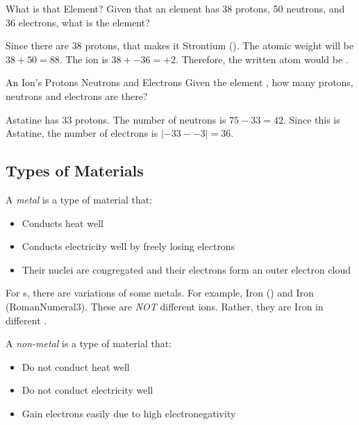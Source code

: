 \begin{example}[]{What is that Element?}
  Given that an element has 38 protons, 50 neutrons, and 36 electrons, what is the element?
  
  \tcblower
  
  Since there are 38 protons, that makes it Strontium ().
  The atomic weight will be $38 + 50 = 88$.
  The ion is $38 + -36 = +2$.
  Therefore, the written atom would be .
\end{example}

\begin{example}[]{An Ion's Protons Neutrons and Electrons}
  Given the element , how many protons, neutrons and electrons are there?
  
  \tcblower
  
  Astatine has 33 protons.
  The number of neutrons is $75 - 33 = 42$.
  Since this is Astatine, the number of electrons is $\lvert -33 - -3 \rvert = 36$.
\end{example}

\subsection{Types of Materials} \label{subsec:Types of Materials}
\begin{definition}[Metal] \label{def:Metal}
  A \emph{metal} is a type of material that:
  \begin{itemize}[noitemsep, nolistsep]
    \item Conducts heat well
    \item Conducts electricity well by freely losing electrons
    \item Their nuclei are congregated and their electrons form an outer electron cloud
  \end{itemize}
  \begin{remark}
    For s, there are variations of some metals.
    For example, Iron () and Iron (RomanNumeral{3}).
    These are \emph{NOT} different ions.
    Rather, they are Iron in different .
  \end{remark}
\end{definition}

\begin{definition} \label{def:Non-Metal}
  A \emph{non-metal} is a type of material that:
  \begin{itemize}[noitemsep, nolistsep]
    \item Do not conduct heat well
    \item Do not conduct electricity well
    \item Gain electrons easily due to high electronegativity
  \end{itemize}
\end{definition}

